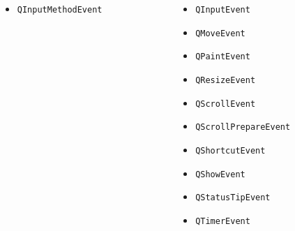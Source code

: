 \begin{frame}
\begin{itemize}
\begin{columns}
\begin{column}{0.36\textwidth}
\begin{itemize}
        \item \texttt{QInputMethodEvent}
      \end{itemize}
      \end{column}
      \begin{column}{0.32\textwidth}
      \begin{itemize}
        \item \texttt{QInputEvent}
        \item \texttt{QMoveEvent}
        \item \texttt{QPaintEvent}
        \item \texttt{QResizeEvent}
        \item \texttt{QScrollEvent}
        \item \texttt{QScrollPrepareEvent}
        \item \texttt{QShortcutEvent}
        \item \texttt{QShowEvent}
        \item \texttt{QStatusTipEvent}
        \item \texttt{QTimerEvent}
      \end{itemize}
      \end{column}
    \end{columns}
  \end{itemize}
\end{frame}

